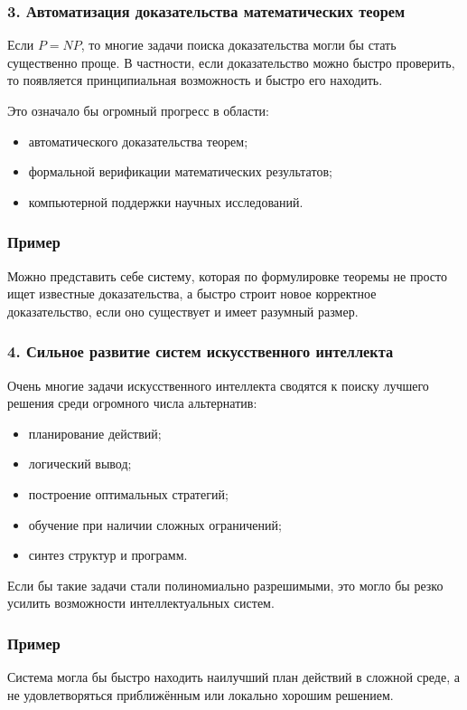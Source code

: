 \documentclass[12pt,a4paper]{article}
\theoremstyle{definition}
\theoremstyle{plain}
\begin{document}
\subsubsection{3. Автоматизация доказательства математических теорем}
Если $P=NP$, то многие задачи поиска доказательства могли бы стать существенно проще. В частности, если доказательство можно быстро проверить, то появляется принципиальная возможность и быстро его находить.

Это означало бы огромный прогресс в области:
\begin{itemize}
\item автоматического доказательства теорем;
\item формальной верификации математических результатов;
\item компьютерной поддержки научных исследований.
\end{itemize}

\subsubsection*{Пример}
Можно представить себе систему, которая по формулировке теоремы не просто ищет известные доказательства, а быстро строит новое корректное доказательство, если оно существует и имеет разумный размер.

\subsubsection{4. Сильное развитие систем искусственного интеллекта}
Очень многие задачи искусственного интеллекта сводятся к поиску лучшего решения среди огромного числа альтернатив:
\begin{itemize}
\item планирование действий;
\item логический вывод;
\item построение оптимальных стратегий;
\item обучение при наличии сложных ограничений;
\item синтез структур и программ.
\end{itemize}

Если бы такие задачи стали полиномиально разрешимыми, это могло бы резко усилить возможности интеллектуальных систем.

\subsubsection*{Пример}
Система могла бы быстро находить наилучший план действий в сложной среде, а не удовлетворяться приближённым или локально хорошим решением.
\end{document}
